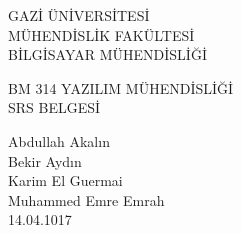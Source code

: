 \begin{titlepage}
   \begin{center}
      \begin{large}
         \vspace*{0.5cm}
         GAZİ ÜNİVERSİTESİ \\
         MÜHENDİSLİK FAKÜLTESİ \\
         BİLGİSAYAR MÜHENDİSLİĞİ

         \vfill
         BM 314 YAZILIM MÜHENDİSLİĞİ \\
         SRS BELGESİ

         \vfill
         Abdullah Akalın\\Bekir Aydın\\Karim El Guermai\\Muhammed Emre Emrah\\

         \vfill
         \vspace{0.5cm}
         14.04.1017
      \end{large}
   \end{center}
\end{titlepage}

